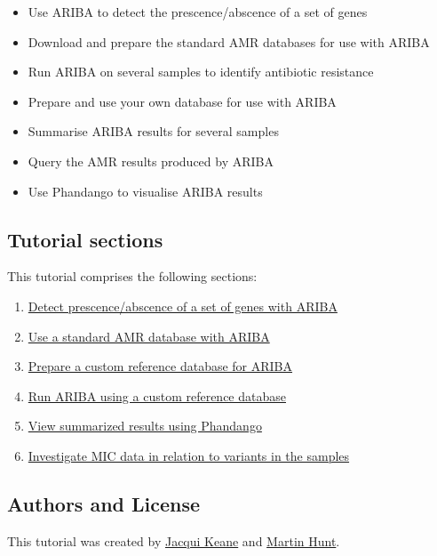 \documentclass[11pt]{article}
\providecommand{\tightlist}{%
      \setlength{\itemsep}{0pt}\setlength{\parskip}{0pt}}
\begin{document}
\begin{itemize}
\tightlist
\item
  Use ARIBA to detect the prescence/abscence of a set of genes
\item
  Download and prepare the standard AMR databases for use with ARIBA
\item
  Run ARIBA on several samples to identify antibiotic resistance
\item
  Prepare and use your own database for use with ARIBA
\item
  Summarise ARIBA results for several samples
\item
  Query the AMR results produced by ARIBA
\item
  Use Phandango to visualise ARIBA results
\end{itemize}

\hypertarget{tutorial-sections}{%
\subsection{Tutorial sections}\label{tutorial-sections}}

This tutorial comprises the following sections:

\begin{enumerate}
\def\labelenumi{\arabic{enumi}.}
\tightlist
\item
  \href{basic_ariba.ipynb}{Detect prescence/abscence of a set of genes
  with ARIBA}
\item
  \href{standard_ariba.ipynb}{Use a standard AMR database with ARIBA}
\item
  \href{make_custom_db.ipynb}{Prepare a custom reference database for
  ARIBA}
\item
  \href{run_ariba.ipynb}{Run ARIBA using a custom reference database}
\item
  \href{phandango.ipynb}{View summarized results using Phandango}
\item
  \href{micplot.ipynb}{Investigate MIC data in relation to variants in
  the samples}
\end{enumerate}

\hypertarget{authors-and-license}{%
\subsection{Authors and License}\label{authors-and-license}}

This tutorial was created by
\href{https://github.com/jacquikeane}{Jacqui Keane} and
\href{https://github.com/martinghunt}{Martin Hunt}.
\end{document}
